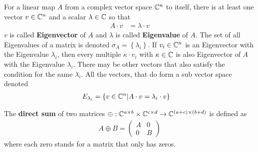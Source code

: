 For a linear map $A$ from a complex vector space $\mathbb{C}^n$ to itself, there is at least one vector $v \in \mathbb{C}^n$ and a scalar $\lambda \in \mathbb{C}$ so that
\begin{align}
    A \cdot v & = \lambda \cdot v
\end{align}
$v$ is called \textbf{Eigenvector} of $A$ and $\lambda$ is called \textbf{Eigenvalue} of $A$.
The set of all Eigenvalues of a matrix is denoted $\sigma_A = \left\{ \lambda_i \right\}$.
If $v_i \in \mathbb{C}^n$ is an Eigenvector with the Eigenvalue $\lambda_i$, then every multiple $\kappa \cdot v_i$ with $\kappa \in \mathbb{C}$ is also Eigenvector of $A$ with the Eigenvalue $\lambda_i$.
There may be other vectors that also satisfy the condition for the same $\lambda_i$.
All the vectors, that do form a sub vector space denoted
\begin{align}
    E_{\lambda_i} & = \left\{ v \in \mathbb{C}^n | A \cdot v = \lambda_i \cdot v \right\}
\end{align}



The \textbf{direct sum} of two matrices $\oplus: \mathbb{C}^{a \times b} \times \mathbb{C}^{c \times d} \to \mathbb{C}^{(a + c) \times (b + d)}$ is defined as
\begin{align}
    A \oplus B = \begin{pmatrix}
        A & 0 \\
        0 & B
    \end{pmatrix}
\end{align}
where each zero stands for a matrix that only has zeros.




